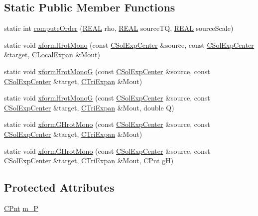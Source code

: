 \subsection*{Static Public Member Functions}
\begin{DoxyCompactItemize}
\item 
static int \hyperlink{classCXFormBase_a8c5d7b2304e9fb04d5d3020743639c24}{compute\-Order} (\hyperlink{util_8h_a5821460e95a0800cf9f24c38915cbbde}{R\-E\-A\-L} rho, \hyperlink{util_8h_a5821460e95a0800cf9f24c38915cbbde}{R\-E\-A\-L} source\-T\-Q, \hyperlink{util_8h_a5821460e95a0800cf9f24c38915cbbde}{R\-E\-A\-L} source\-Scale)
\item 
static void \hyperlink{classCXFormBase_ad0fd3198d0f3d4e57b90bb61fa113b35}{xform\-Hrot\-Mono} (const \hyperlink{classCSolExpCenter}{C\-Sol\-Exp\-Center} \&source, const \hyperlink{classCSolExpCenter}{C\-Sol\-Exp\-Center} \&target, \hyperlink{classCLocalExpan}{C\-Local\-Expan} \&Mout)
\item 
static void \hyperlink{classCXFormBase_ac842b6a7dc833bee2c924009afb8f5ad}{xform\-Hrot\-Mono\-G} (const \hyperlink{classCSolExpCenter}{C\-Sol\-Exp\-Center} \&source, const \hyperlink{classCSolExpCenter}{C\-Sol\-Exp\-Center} \&target, \hyperlink{classCTriExpan}{C\-Tri\-Expan} \&Mout)
\item 
static void \hyperlink{classCXFormBase_af22c7a6708f20815f19db4510ac80fbf}{xform\-Hrot\-Mono\-G} (const \hyperlink{classCSolExpCenter}{C\-Sol\-Exp\-Center} \&source, const \hyperlink{classCSolExpCenter}{C\-Sol\-Exp\-Center} \&target, \hyperlink{classCTriExpan}{C\-Tri\-Expan} \&Mout, double Q)
\item 
static void \hyperlink{classCXFormBase_acb6b9ff1c60ba3e117c975144ac67923}{xform\-G\-Hrot\-Mono} (const \hyperlink{classCSolExpCenter}{C\-Sol\-Exp\-Center} \&source, const \hyperlink{classCSolExpCenter}{C\-Sol\-Exp\-Center} \&target, \hyperlink{classCTriExpan}{C\-Tri\-Expan} \&Mout)
\item 
static void \hyperlink{classCXFormBase_a83d01036b747960639d459e5b14f4ba2}{xform\-G\-Hrot\-Mono} (const \hyperlink{classCSolExpCenter}{C\-Sol\-Exp\-Center} \&source, const \hyperlink{classCSolExpCenter}{C\-Sol\-Exp\-Center} \&target, \hyperlink{classCTriExpan}{C\-Tri\-Expan} \&Mout, \hyperlink{classCPnt}{C\-Pnt} g\-H)
\end{DoxyCompactItemize}
\subsection*{Protected Attributes}
\begin{DoxyCompactItemize}
\item 
\hyperlink{classCPnt}{C\-Pnt} \hyperlink{classCXFormBase_a024b11a051eaf8d857bbc44c96a02e92}{m\-\_\-\-P}
\end{DoxyCompactItemize}


